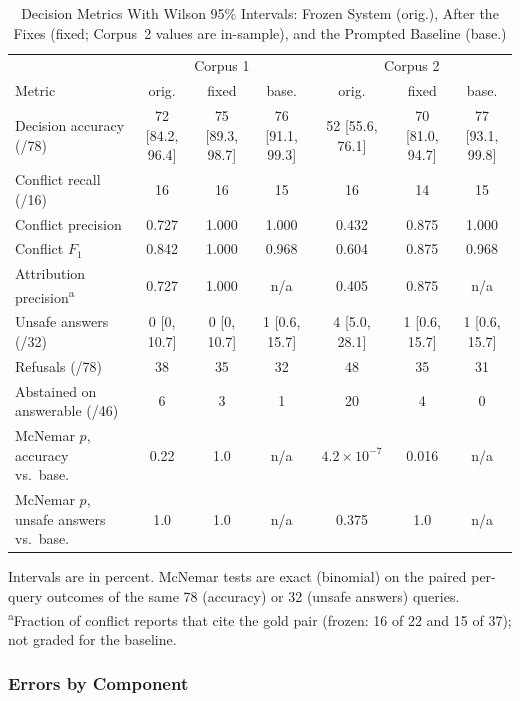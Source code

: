\documentclass[conference]{IEEEtran}
\begin{document}
\begin{table}[t]
\caption{Decision Metrics With Wilson 95\% Intervals: Frozen System (orig.),
After the Fixes (fixed; Corpus~2 values are in-sample), and the Prompted
Baseline (base.)}
\label{tab:ci_mcnemar}
\centering
\small
\begin{tabular}{l c c c c c c}
\toprule
 & \multicolumn{3}{c}{Corpus 1} & \multicolumn{3}{c}{Corpus 2} \\
Metric & orig. & fixed & base. & orig. & fixed & base. \\
\midrule
Decision accuracy (/78) & 72 [84.2, 96.4] & 75 [89.3, 98.7] & 76 [91.1, 99.3]
                        & 52 [55.6, 76.1] & 70 [81.0, 94.7] & 77 [93.1, 99.8] \\
Conflict recall (/16)   & 16 & 16 & 15 & 16 & 14 & 15 \\
Conflict precision      & 0.727 & 1.000 & 1.000 & 0.432 & 0.875 & 1.000 \\
Conflict $F_1$          & 0.842 & 1.000 & 0.968 & 0.604 & 0.875 & 0.968 \\
Attribution precision\textsuperscript{a} & 0.727 & 1.000 & n/a & 0.405 & 0.875 & n/a \\
Unsafe answers (/32)    & 0 [0, 10.7] & 0 [0, 10.7] & 1 [0.6, 15.7]
                        & 4 [5.0, 28.1] & 1 [0.6, 15.7] & 1 [0.6, 15.7] \\
Refusals (/78)          & 38 & 35 & 32 & 48 & 35 & 31 \\
Abstained on answerable (/46) & 6 & 3 & 1 & 20 & 4 & 0 \\
\midrule
McNemar $p$, accuracy vs.\ base.      & 0.22 & 1.0 & n/a & $4.2\times10^{-7}$ & 0.016 & n/a \\
McNemar $p$, unsafe answers vs.\ base. & 1.0  & 1.0 & n/a & 0.375 & 1.0 & n/a \\
\bottomrule
\end{tabular}

\vspace{3pt}
\raggedright\scriptsize
Intervals are in percent. McNemar tests are exact (binomial) on the paired
per-query outcomes of the same 78 (accuracy) or 32 (unsafe answers) queries.
\textsuperscript{a}Fraction of conflict reports that cite the gold pair
(frozen: 16 of 22 and 15 of 37); not graded for the baseline.
\end{table}

\subsubsection{Errors by Component}
\label{sec:errors_component}
\end{document}
